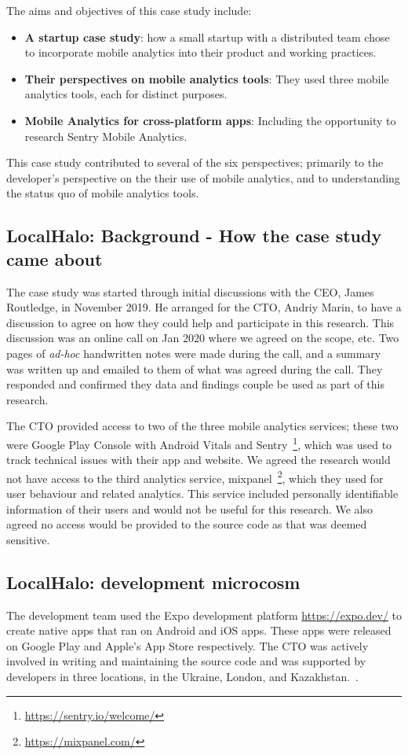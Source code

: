 The aims and objectives of this case study include:
\begin{itemize}
    \item \textbf{A startup case study}: how a small startup with a distributed team chose to incorporate mobile analytics into their product and working practices.
    \item \textbf{Their perspectives on mobile analytics tools}: They used three mobile analytics tools, each for distinct purposes. 
    \item \textbf{Mobile Analytics for cross-platform apps}: Including the opportunity to research Sentry Mobile Analytics. 
\end{itemize}

This case study contributed to several of the six perspectives; primarily to the developer's perspective on the their use of mobile analytics, and to understanding the status quo of mobile analytics tools.


\subsection{LocalHalo: Background - How the case study came about}
The case study was started through initial discussions with the CEO, James Routledge, in November 2019. He arranged for the CTO, Andriy Marin, to have a discussion to agree on how they could help and participate in this research. This discussion was an online call on  Jan 2020 where we agreed on the scope, etc. Two pages of \emph{ad-hoc} handwritten notes were made during the call, and a summary was written up and emailed to them of what was agreed during the call. They responded and confirmed they data and findings couple be used as part of this research.

The CTO provided access to two of the three mobile analytics services; these two were Google Play Console with Android Vitals and Sentry~\footnote{\url{https://sentry.io/welcome/}}, which was used to track technical issues with their app and website. We agreed the research would not have access to the third analytics service, mixpanel~\footnote{\url{https://mixpanel.com/}}, which they used for user behaviour and related analytics. This service included personally identifiable information of their users and would not be useful for this research. We also agreed no access would be provided to the source code as that was deemed sensitive. 

\subsection{LocalHalo: development microcosm}
The development team used the Expo development platform \url{https://expo.dev/} to create native apps that ran on Android and iOS apps. These apps were released on Google Play and Apple's App Store respectively. The CTO was actively involved in writing and maintaining the source code and was supported by developers in three locations, in the Ukraine, London, and Kazakhstan.~\citep{karpenko2019_localhalo_a_social_network_for_neighbors}. 

